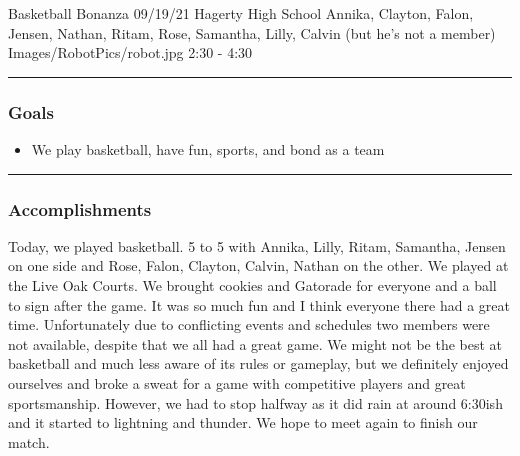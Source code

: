\insertmeeting 
	{Basketball Bonanza} 
	{09/19/21}
	{Hagerty High School}
	{Annika, Clayton, Falon, Jensen, Nathan, Ritam, Rose, Samantha, Lilly, Calvin (but he’s not a member)}
	{Images/RobotPics/robot.jpg}
	{2:30 - 4:30}
	
\noindent\hfil\rule{\textwidth}{.4pt}\hfil
\subsubsection*{Goals}
\begin{itemize}
    \item We play basketball, have fun, sports, and bond as a team  

\end{itemize} 

\noindent\hfil\rule{\textwidth}{.4pt}\hfil

\subsubsection*{Accomplishments}
Today, we played basketball. 5 to 5 with Annika, Lilly, Ritam, Samantha, Jensen on one side and Rose, Falon, Clayton, Calvin, Nathan on the other. We played at the Live Oak Courts. We brought cookies and Gatorade for everyone and a ball to sign after the game. It was so much fun and I think everyone there had a great time. Unfortunately due to conflicting events and schedules two members were not available, despite that we all had a great game.  We might not be the best at basketball and much less aware of its rules or gameplay, but we definitely enjoyed ourselves and broke a sweat for a game with competitive players and great sportsmanship. However, we had to stop halfway as it did rain at around 6:30ish and it started to lightning and thunder. We hope to meet again to finish our match. 


